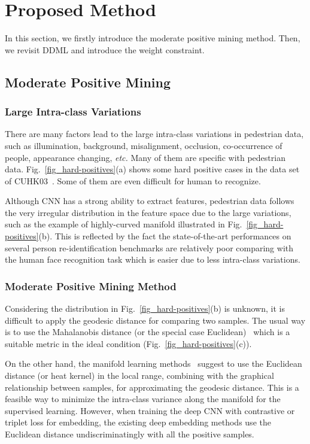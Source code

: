 \documentclass[runningheads]{llncs}
\begin{document}
\section{Proposed Method}
\label{section_Proposed Method}

In this section, we firstly introduce the moderate positive mining method.
Then, we revisit DDML and introduce the weight constraint.

\subsection{Moderate Positive Mining}
\label{section_Moderate Positive Mining}

\subsubsection{Large Intra-class Variations}
There are many factors lead to the large intra-class variations in pedestrian data, such as illumination, background, misalignment, occlusion, co-occurrence of people, appearance changing, \emph{etc.}
Many of them are specific with pedestrian data.
Fig.~\ref{fig_hard-positives}(a) shows some hard positive cases in the data set of CUHK03~\cite{li2014deepreid}.
Some of them are even difficult for human to recognize.

Although CNN has a strong ability to extract features, pedestrian data follows the very irregular distribution in the feature space due to the large variations, such as the example of highly-curved manifold illustrated in Fig.~\ref{fig_hard-positives}(b).
This is reflected by the fact the state-of-the-art performances on several person re-identification benchmarks are relatively poor comparing with the human face recognition task which is easier due to less intra-class variations.

\subsubsection{Moderate Positive Mining Method}
Considering the distribution in Fig.~\ref{fig_hard-positives}(b) is unknown, it is difficult to apply the geodesic distance for comparing two samples. The usual way is to use the Mahalanobis distance (or the special case Euclidean)~\cite{ding2015deep,schroff2015facenet,hu2014discriminative} which is a suitable metric in the ideal condition (Fig.~\ref{fig_hard-positives}(c)).

On the other hand, the manifold learning methods~\cite{tenenbaum2000global,roweis2000nonlinear,belkin2003laplacian} suggest to use the Euclidean distance (or heat kernel) in the local range, combining with the graphical relationship between samples, for approximating the geodesic distance.
This is a feasible way to minimize the intra-class variance along the manifold for the supervised learning.
However, when training the deep CNN with contrastive or triplet loss for embedding, the existing deep embedding methods use the Euclidean distance undiscriminatingly with all the positive samples.
\end{document}
